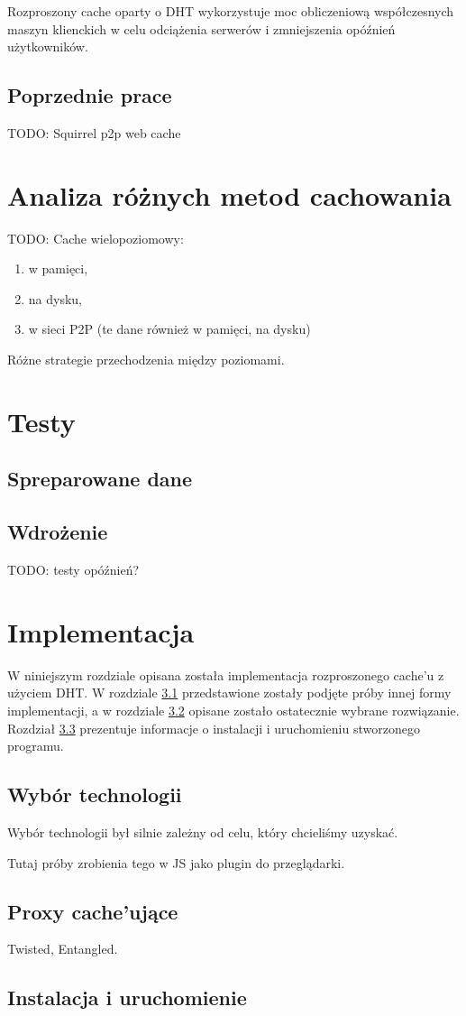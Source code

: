 \documentclass[a4paper,11pt]{scrartcl}
\newcommand{\s}{ }
\newcommand{\kesz}{cache}
\newcommand{\keszu}{cache'u}
\newcommand{\keszujace}{cache'ujące}
\begin{document}
Rozproszony \kesz\s oparty o DHT wykorzystuje moc obliczeniową współczesnych maszyn klienckich w celu odciążenia serwerów i zmniejszenia opóźnień użytkowników.



\subsection{Poprzednie prace}
TODO: Squirrel p2p web cache \cite{iyer2002squirrel}

\section{Analiza różnych metod cachowania}
TODO:
Cache wielopoziomowy:
\begin{enumerate}
  \item w pamięci,
  \item na dysku,
  \item w sieci P2P (te dane również w pamięci, na dysku)
\end{enumerate}
Różne strategie przechodzenia między poziomami.

\section{Testy}
\subsection{Spreparowane dane}


\subsection{Wdrożenie}
TODO: testy opóźnień?

\section{Implementacja}
W niniejszym rozdziale opisana została implementacja rozproszonego \keszu\s z użyciem DHT. W rozdziale \ref{sect_impl_technology}
przedstawione zostały podjęte próby innej formy implementacji, a w rozdziale \ref{sect_impl_proxy} opisane zostało ostatecznie wybrane rozwiązanie.
Rozdział \ref{sect_impl_install} prezentuje informacje o instalacji i uruchomieniu stworzonego programu.

\subsection{Wybór technologii}
\label{sect_impl_technology}
Wybór technologii był silnie zależny od celu, który chcieliśmy uzyskać. 

Tutaj próby zrobienia tego w JS jako plugin do przeglądarki.

\subsection{Proxy \keszujace}
\label{sect_impl_proxy}
Twisted, Entangled.
\subsection{Instalacja i uruchomienie}
\label{sect_impl_install}





\end{document}
